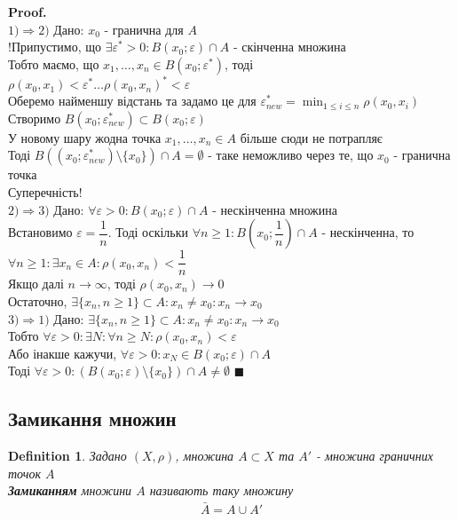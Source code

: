 \documentclass[a4paper, 14pt]{extarticle}
\def\huge{\displaystyle}
\theoremstyle{theoremdd}
\theoremstyle{theoremdd}
\newtheorem{definition}[theorem]{Definition}
\theoremstyle{theoremdd}
\theoremstyle{theoremdd}
\theoremstyle{theoremdd}
\theoremstyle{theoremdd}
\theoremstyle{theoremdd}
\theoremstyle{theoremdd}
\newenvironment{pf}{\vspace*{-3mm} \textbf{Proof. \\}}{$\blacksquare$}
\begin{document}
\begin{pf}
$\boxed{1) \Rightarrow 2)}$ Дано: $x_0$ - гранична для $A$\\
!Припустимо, що $\exists \varepsilon^* > 0: B(x_0;\varepsilon) \cap A$ - скінченна множина\\
Тобто маємо, що $x_1,\dots,x_n \in B(x_0;\varepsilon^*)$, тоді\\
$\rho(x_0,x_1) < \varepsilon^* \dots \rho(x_0,x_n)^* < \varepsilon$\\
Оберемо найменшу відстань та задамо це для $\varepsilon^*_{new} = \huge \min_{1\leq i \leq n} \rho(x_0,x_i)$\\
Створимо $B(x_0;\varepsilon^*_{new}) \subset B(x_0; \varepsilon)$\\
У новому шару жодна точка $x_1,\dots,x_n \in A$ більше сюди не потрапляє\\
Тоді $B((x_0;\varepsilon^*_{new}) \setminus \{x_0\}) \cap A = \emptyset$ - таке неможливо через те, що $x_0$ - гранична точка\\
Суперечність!
\bigskip \\

$\boxed{2) \Rightarrow 3)}$ Дано: $\forall \varepsilon > 0: B(x_0;\varepsilon) \cap A$ - нескінченна множина\\
Встановимо $\varepsilon = \dfrac{1}{n}$. Тоді оскільки $\forall n \geq 1: B \left(x_0;\dfrac{1}{n} \right) \cap A$ - нескінченна, то\\
$\forall n \geq 1: \exists x_n \in A: \rho(x_0,x_n) < \dfrac{1}{n}$\\
Якщо далі $n \to \infty$, тоді $\rho(x_0,x_n) \to 0$\\
Остаточно, $\exists \{x_n, n \geq 1\} \subset A: x_n \neq x_0: x_n \to x_0$
\bigskip \\

$\boxed{3) \Rightarrow 1)}$ Дано: $\exists \{x_n, n \geq 1\} \subset A: x_n \neq x_0: x_n \to x_0$\\
Тобто $\forall \varepsilon > 0: \exists N: \forall n \geq N: \rho(x_0,x_n) < \varepsilon$\\
Або інакше кажучи, $\forall \varepsilon > 0: x_N \in B(x_0;\varepsilon) \cap A$\\
Тоді $\forall \varepsilon > 0: (B(x_0;\varepsilon) \setminus \{x_0\}) \cap A \neq \emptyset$
\end{pf}

\subsection{Замикання множин}
\begin{definition}
Задано $(X,\rho)$, множина $A \subset X$ та $A'$ - множина граничних точок $A$\\
\textbf{Замиканням} множини $A$ називають таку множину
\begin{align*}
\bar{A} = A \cup A'
\end{align*}
\end{definition}
\end{document}
